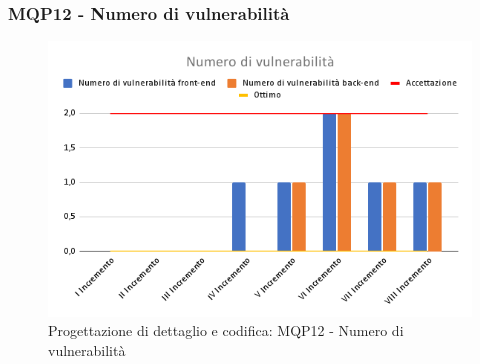 \subsubsection{MQP12 - Numero di vulnerabilità}
\begin{figure}[H]
    \centering
    \includegraphics[scale=0.50]{Sezioni/images/pb_prodotto/Numero_di_vulnerabilita.png}
    \caption{Progettazione di dettaglio e codifica: MQP12 - Numero di vulnerabilità}
\end{figure}
